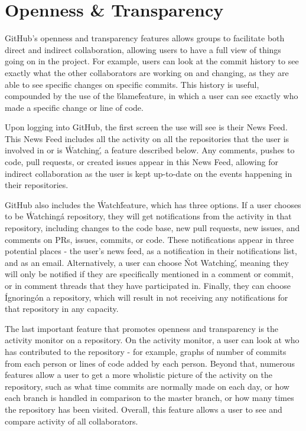 \section{Openness \& Transparency}
GitHub's openness and transparency features allows groups to facilitate both direct and indirect collaboration, allowing users to have a full view of things going on in the project. For example, users can look at the commit history to see exactly what the other collaborators are working on and changing, as they are able to see specific changes on specific commits. This history is useful, compounded by the use of the \'blame\' feature, in which a user can see exactly who made a specific change or line of code. %

Upon logging into GitHub, the first screen the use will see is their News Feed. This News Feed includes all the activity on all the repositories that the user is involved in or is \'Watching\', a feature described below. Any comments, pushes to code, pull requests, or created issues appear in this News Feed, allowing for indirect collaboration as the user is kept up-to-date on the events happening in their repositories.

GitHub also includes the \'Watch\' feature, which has three options. If a user chooses to be \'Watching\' a repository, they will get notifications from the activity in that repository, including changes to the code base, new pull requests, new issues, and comments on PRs, issues, commits, or code. These notifications appear in three potential places - the user's news feed, as a notification in their notifications list, and as an email. Alternatively, a user can choose \'Not Watching\', meaning they will only be notified if they are specifically mentioned in a comment or commit, or in comment threads that they have participated in. Finally, they can choose \'Ignoring\' on a repository, which will result in not receiving any notifications for that repository in any capacity.

The last important feature that promotes openness and transparency is the activity monitor on a repository. On the activity monitor, a user can look at who has contributed to the repository - for example, graphs of number of commits from each person or lines of code added by each person. Beyond that, numerous features allow a user to get a more wholistic picture of the activity on the repository, such as what time commits are normally made on each day, or how each branch is handled in comparison to the master branch, or how many times the repository has been visited. Overall, this feature allows a user to see and compare activity of all collaborators.

